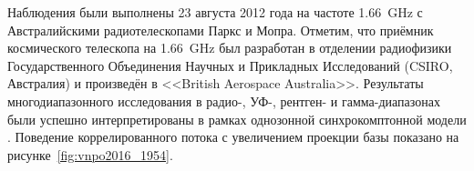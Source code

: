 Наблюдения были выполнены 23 августа 2012 года на частоте \SI{1.66}{\GHz} с Австралийскими
радиотелескопами Паркс и Мопра. Отметим, что приёмник космического телескопа на \SI{1.66}{\GHz} был
разработан в отделении радиофизики Государственного Объединения Научных и Прикладных Исследований
(CSIRO, Австралия) и произведён в <<British Aerospace Australia>>. Результаты многодиапазонного
исследования в радио-, УФ-, рентген- и гамма-диапазонах были успешно интерпретированы в рамках
однозонной синхрокомптонной модели \cite{Edwards_2017}. Поведение коррелированного потока с
увеличением проекции базы показано на рисунке~\ref{fig:vnpo2016_1954}.
